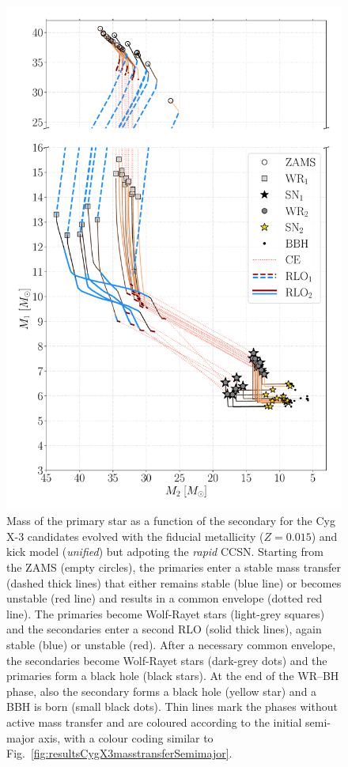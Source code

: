 \documentclass[a4paper,titlepage]{book}     	%
\begin{document}
\begin{appendices}
\begin{figure}
	\centering
	\includegraphics[width=.9\textwidth]{./images/rap_Mass_1_Mass_0_BHBH_GW_WRBH_cyg_x-3--Ko17.pdf}
	\caption{Mass of the primary star as a function of the secondary for the Cyg X-3 candidates evolved with the fiducial metallicity ($Z=0.015$) and kick model (\emph{unified}) but adpoting the \emph{rapid} CCSN. Starting from the ZAMS (empty circles), the primaries enter a stable mass transfer (dashed thick lines) that either remains stable (blue line) or becomes unstable (red line) and results in a common envelope (dotted red line). The primaries become Wolf-Rayet stars (light-grey squares) and the secondaries enter a second RLO (solid thick lines), again stable (blue) or unstable (red). After a necessary common envelope, the secondaries become Wolf-Rayet stars (dark-grey dots) and the primaries form a black hole (black stars). At the end of the WR--BH phase, also the secondary forms a black hole (yellow star) and a BBH is born (small black dots). Thin lines mark the phases without active mass transfer and are coloured according to the initial semi-major axis, with a colour coding similar to Fig.\ \ref{fig:resultsCygX3masstransferSemimajor}.}\label{fig:resultsCygX3masstransferM1M2rapid}
\end{figure}


\end{appendices}
\end{document}
